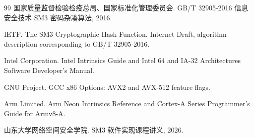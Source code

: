 \documentclass[UTF8,a4paper,12pt]{ctexart}
\begin{document}
\begin{thebibliography}{99}
国家质量监督检验检疫总局、国家标准化管理委员会. GB/T 32905-2016 信息安全技术 SM3 密码杂凑算法, 2016.

IETF. The SM3 Cryptographic Hash Function. Internet-Draft, algorithm description corresponding to GB/T 32905-2016.

Intel Corporation. Intel Intrinsics Guide and Intel 64 and IA-32 Architectures Software Developer's Manual.

GNU Project. GCC x86 Options: AVX2 and AVX-512 feature flags.

Arm Limited. Arm Neon Intrinsics Reference and Cortex-A Series Programmer's Guide for Armv8-A.

山东大学网络空间安全学院. SM3 软件实现课程讲义, 2026.
\end{thebibliography}
\end{document}
